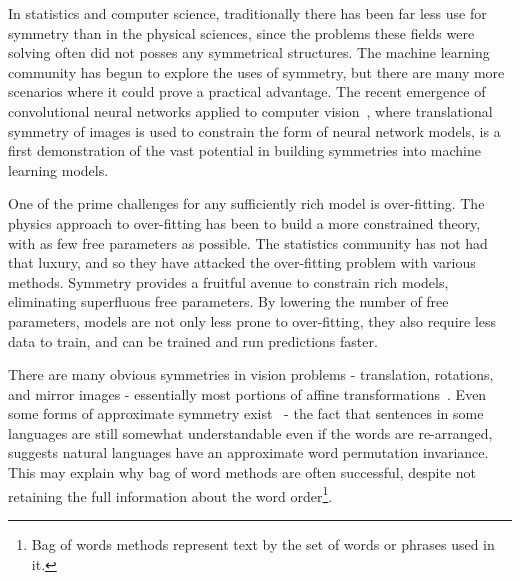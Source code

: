 \documentclass[onecolumn, nofootinbib, aps, pra, 11pt]{revtex4-1}
\begin{document}

In statistics and computer science, traditionally there has been far less use for symmetry than in the physical sciences,
since the problems these fields were solving often did not posses any symmetrical structures. The machine learning community has begun to explore the uses of symmetry, but there are many more scenarios where it could prove a practical advantage. The recent emergence of convolutional neural networks applied to computer vision~\citep{lecun1989generalization, lecun1999object, lecun1990handwritten, lecun1998gradient, krizhevsky2012imagenet, lee2009convolutional, lecun2015deep}, where translational symmetry of images is used to constrain the form of neural network models, is a first demonstration of the vast potential in building symmetries into machine learning models.


One of the prime challenges for any sufficiently rich model is over-fitting. The physics approach to over-fitting has been to build a more constrained theory, with as few free parameters as possible. The statistics community has not had that luxury, and so they have attacked the over-fitting problem with various methods. Symmetry provides a fruitful avenue to constrain rich models, eliminating superfluous free parameters. By lowering the number of free parameters, models are not only less prone to over-fitting, they also require less data to train, and can be trained and run predictions faster.


There are many obvious symmetries in vision problems - translation, rotations, and mirror images - essentially most portions of affine transformations~\citep{gens2014deep, dieleman2016exploiting, cohen2016group, henriques2016warped}. Even some forms of approximate symmetry exist~\citep{kiddonsymmetry} - the fact that sentences in some languages are still somewhat understandable even if the words are re-arranged, suggests natural languages have an approximate word permutation invariance. This may explain why bag of word methods are often successful, despite not retaining the full information about the word order\footnote{Bag of words methods represent text by the set of words or phrases used in it.}. 
\end{document}
